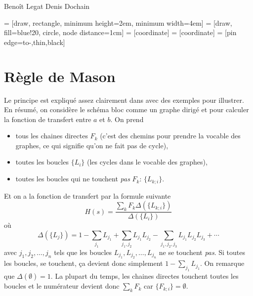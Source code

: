 

\usepackage{graphicx}
\usepackage{caption}
\usepackage{subcaption}
\newcommand{\laplace}{\mathcal{L}}

\lstset{language=Matlab}

\newcommand{\sbt}{\,\begin{picture}(-1,1)(-1,-3)\circle*{2.5}\end{picture}\ }
\newcommand{\umin}{u_\mathrm{min}}
\newcommand{\umax}{u_\mathrm{max}}

\usepackage{tikz}
\usepackage{pgfplots}
\usetikzlibrary{arrows,calc}

{Benoît Legat}
{Denis Dochain}

 = [draw, rectangle, minimum height=2em, minimum width=4em]
 = [draw, fill=blue!20, circle, node distance=1cm]
 = [coordinate]  = [coordinate]
 = [pin edge={to-,thin,black}]




\section{Règle de Mason}
Le principe est expliqué assez clairement dans \cite{chau2002mason}
avec des exemples pour illustrer.
En résumé, on considère le schéma bloc comme un graphe dirigé et
pour calculer la fonction de transfert entre $a$ et $b$.
On prend
\begin{itemize}
  \item tous les chaines directes $F_k$ (c'est des chemins pour prendre la vocable des graphes, ce qui signifie qu'on ne fait pas de cycle),
  \item toutes les boucles $\{L_i\}$ (les cycles dans le vocable des graphes),
  \item toutes les boucles qui ne touchent \emph{pas} $F_k$: $\{L_{k;i}\}$.
\end{itemize}
Et on a la fonction de transfert par la formule suivante
\[ H(s) = \frac{\sum_k F_k\Delta(\{L_{k;i}\})}{\Delta(\{L_i\})} \]
où
\[ \Delta(\{L_j\}) = 1 - \sum_{j_1} L_{j_1} + \sum_{j_1,j_2} L_{j_1}L_{j_2} - \sum_{j_1,j_2,j_3} L_{j_1}L_{j_2}L_{j_3} + \cdots \]
avec $j_1, j_2, \ldots, j_n$ tels que les boucles $L_{j_1}, L_{j_2}, \ldots, L_{j_n}$ ne se touchent \emph{pas}.
Si toutes les boucles, se touchent, ça devient donc simplement
\( 1 - \sum_{j_1} L_{j_1}. \)
On remarque que $\Delta(\emptyset) = 1$.
La plupart du temps, les chaines directes touchent toutes les boucles et le numérateur devient donc $\sum_k F_k$ car $\{F_{k;i}\} = \emptyset$.

